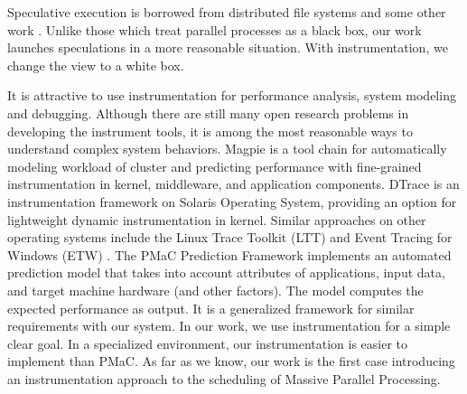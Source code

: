 Speculative execution is borrowed from distributed file systems
\cite{Nightingale:2006:SED:1189256.1189258} and some other work
\cite{Su:2007:AIC:1294261.1294284} . Unlike those which treat parallel processes as a black box, our work launches
speculations in a more reasonable situation. With instrumentation, we change the view to a
white box.

It is attractive to use instrumentation for performance analysis, system modeling and debugging.
Although there are still many open research problems in developing
the instrument tools, it is among the most reasonable ways to understand complex system
behaviors. Magpie \cite{Barham:2004:UMR:1251254.1251272} is a tool chain for automatically
modeling workload of cluster and predicting performance with fine-grained instrumentation
in kernel, middleware, and application components. DTrace
\cite{Cantrill:2004:DIP:1247415.1247417} is an instrumentation framework on Solaris
Operating System, providing an option for lightweight dynamic instrumentation in kernel.
Similar approaches on other operating systems include the Linux Trace Toolkit (LTT)
\cite{Yaghmour:2000:MCS:1267724.1267726} and Event Tracing for Windows (ETW) \cite{etw}.
The PMaC Prediction Framework \cite{Carrington:2006:PPF:1134241.1708446} implements
an automated prediction model that takes into account attributes of
applications, input data, and target machine hardware (and other factors). The model
computes the expected performance as output. It is a generalized framework for similar 
requirements with our system. In our work, we use instrumentation for a simple clear goal. In a
specialized environment, our instrumentation is easier to implement than PMaC. As far
as we know, our work is the first case introducing an instrumentation approach to the
scheduling of Massive Parallel Processing.

